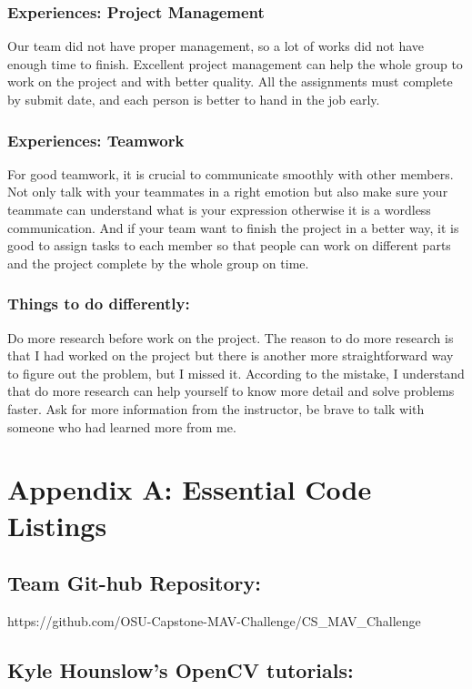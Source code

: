 \documentclass[onecolumn, draftclsnofoot,10pt, compsoc]{IEEEtran}
\begin{document}
\subsubsection{Experiences: Project Management}
Our team did not have proper management, so a lot of works did not have enough time to finish. Excellent project management can help the whole group to work on the project and with better quality. All the assignments must complete by submit date, and each person is better to hand in the job early.

\subsubsection{Experiences: Teamwork}
For good teamwork, it is crucial to communicate smoothly with other members. Not only talk with your teammates in a right emotion but also make sure your teammate can understand what is your expression otherwise it is a wordless communication. And if your team want to finish the project in a better way, it is good to assign tasks to each member so that people can work on different parts and the project complete by the whole group on time.

\subsubsection{Things to do differently:}
Do more research before work on the project. The reason to do more research is that I had worked on the project but there is another more straightforward way to figure out the problem, but I missed it. According to the mistake, I understand that do more research can help yourself to know more detail and solve problems faster. Ask for more information from the instructor, be brave to talk with someone who had learned more from me. 


\section{Appendix A: Essential Code Listings}

\subsection{Team Git-hub Repository:}

https://github.com/OSU-Capstone-MAV-Challenge/CS\_MAV\_Challenge

\subsection{Kyle Hounslow's OpenCV tutorials:}
\end{document}
